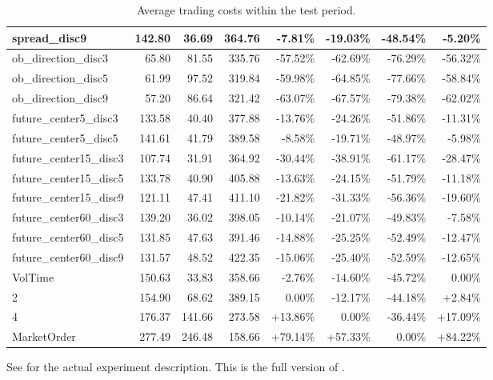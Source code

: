 \begin{table}[ht]
{\begin{tabular}{lRRR|RRRR}
spread\_disc9                 &    142.80 &   36.69 &  364.76 &   -7.81\% &  -19.03\% &  -48.54\% &       -5.20\% \\
\midrule
ob\_direction\_disc3           &     65.80 &   81.55 &  335.76 &  -57.52\% &  -62.69\% &  -76.29\% &      -56.32\% \\
ob\_direction\_disc5           &     61.99 &   97.52 &  319.84 &  -59.98\% &  -64.85\% &  -77.66\% &      -58.84\% \\
ob\_direction\_disc9           &     57.20 &   86.64 &  321.42 &  -63.07\% &  -67.57\% &  -79.38\% &      -62.02\% \\
future\_center5\_disc3         &    133.58 &   40.40 &  377.88 &  -13.76\% &  -24.26\% &  -51.86\% &      -11.31\% \\
future\_center5\_disc5         &    141.61 &   41.79 &  389.58 &   -8.58\% &  -19.71\% &  -48.97\% &       -5.98\% \\
future\_center15\_disc3        &    107.74 &   31.91 &  364.92 &  -30.44\% &  -38.91\% &  -61.17\% &      -28.47\% \\
future\_center15\_disc5        &    133.78 &   40.90 &  405.88 &  -13.63\% &  -24.15\% &  -51.79\% &      -11.18\% \\
future\_center15\_disc9        &    121.11 &   47.41 &  411.10 &  -21.82\% &  -31.33\% &  -56.36\% &      -19.60\% \\
future\_center60\_disc3        &    139.20 &   36.02 &  398.05 &  -10.14\% &  -21.07\% &  -49.83\% &       -7.58\% \\
future\_center60\_disc5        &    131.85 &   47.63 &  391.46 &  -14.88\% &  -25.25\% &  -52.49\% &      -12.47\% \\
future\_center60\_disc9        &    131.57 &   48.52 &  422.35 &  -15.06\% &  -25.40\% &  -52.59\% &      -12.65\% \\
\midrule
VolTime                      &    150.63 &   33.83 &  358.66 &   -2.76\% &  -14.60\% &  -45.72\% &        0.00\% \\
2                            &    154.90 &   68.62 &  389.15 &    0.00\% &  -12.17\% &  -44.18\% &        +2.84\% \\
4                            &    176.37 &  141.66 &  273.58 &   +13.86\% &    0.00\% &  -36.44\% &       +17.09\% \\
MarketOrder                  &    277.49 &  246.48 &  158.66 &   +79.14\% &   +57.33\% &    0.00\% &       +84.22\% \\
\bottomrule
\end{tabular}
}

        		\caption[Full version of ]{Average trading costs within the test period.}
		See  for the actual experiment description. This is the full version of .
		\label{tab:eval:additionalMarketVariables:fulltable}

\end{table}
\clearpage{}



